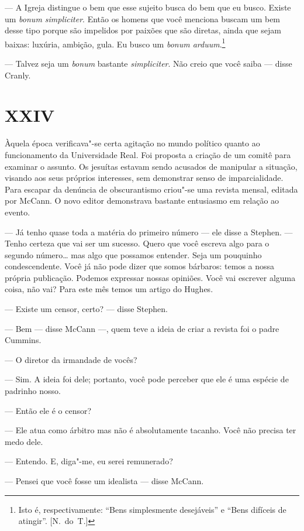 --- A Igreja distingue o bem que esse sujeito busca do bem que eu busco.
Existe um \textit{bonum simpliciter}.  Então os homens que você menciona buscam
um bem desse tipo porque são impelidos por paixões que são diretas,
ainda que sejam baixas: luxúria, ambição, gula.  Eu busco um \textit{bonum
arduum}.\footnote[\setcounter{symbol}{2}]{ Isto é, respectivamente: “Bens simplesmente desejáveis” e
“Bens difíceis de atingir”. [N.~do~T.]}

--- Talvez seja um \textit{bonum} bastante \textit{simpliciter}.  Não creio que
você saiba --- disse Cranly.


\section{XXIV}

Àquela época verificava"-se certa agitação no mundo político quanto ao
funcionamento da Universidade Real.  Foi proposta a criação de um comitê para
examinar o assunto.  Os jesuítas estavam sendo acusados de manipular a
situação, visando aos seus próprios interesses, sem demonstrar senso de
imparcialidade.  Para escapar da denúncia de obscurantismo criou"-se uma revista
mensal, editada por McCann.  O novo editor demonstrava bastante entusiasmo em
relação ao evento.

--- Já tenho quase toda a matéria do primeiro número --- ele disse a Stephen.
--- Tenho certeza que vai ser um sucesso.  Quero que você escreva algo para o
segundo número\ldots{} mas algo que possamos entender.  Seja um pouquinho
condescendente.  Você já não pode dizer que somos bárbaros: temos a nossa
própria publicação.  Podemos expressar nossas opiniões.  Você vai escrever
alguma coisa, não vai?  Para este mês temos um artigo do Hughes.

--- Existe um censor, certo? --- disse Stephen.

--- Bem --- disse McCann ---, quem teve a ideia de criar a revista foi o padre
Cummins.

--- O diretor da irmandade de vocês?

--- Sim.  A ideia foi dele; portanto, você pode perceber que ele é uma espécie
de padrinho nosso.

--- Então ele é o censor?

--- Ele atua como árbitro mas não é absolutamente tacanho.  Você não precisa
ter medo dele.

--- Entendo.  E, diga"-me, eu serei remunerado?

--- Pensei que você fosse um idealista --- disse McCann.

